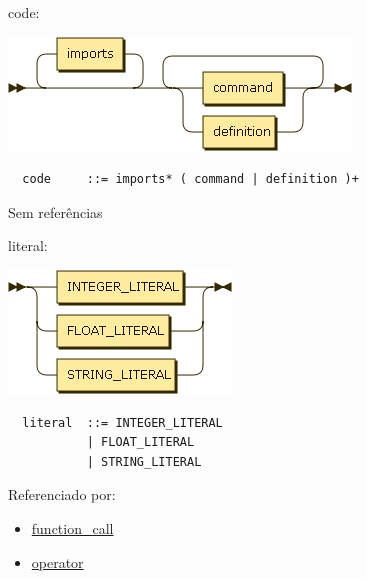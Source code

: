 \begin{minipage}{\textwidth}
  \protect\hypertarget{code}{}{code:}

  \includegraphics[width=3.58333in,height=1.18750in]{diagram/code.png}

  \begin{verbatim}
  code     ::= imports* ( command | definition )+
  \end{verbatim}

  Sem referências

\end{minipage}

\begin{minipage}{\textwidth}
  \protect\hypertarget{literal}{}{literal:}

  \includegraphics[width=2.33333in,height=1.29167in]{diagram/literal.png}

  \begin{verbatim}
  literal  ::= INTEGER_LITERAL
           | FLOAT_LITERAL
           | STRING_LITERAL
  \end{verbatim}

  Referenciado por:

  \begin{itemize}
      \tightlist%
    \item
      \protect\hyperlink{function_call}{function\_call}
    \item
      \protect\hyperlink{operator}{operator}
  \end{itemize}

\end{minipage}

